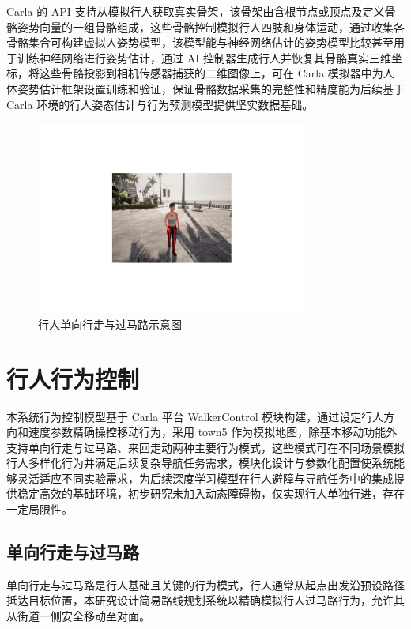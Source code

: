 Carla 的 API 支持从模拟行人获取真实骨架，该骨架由含根节点或顶点及定义骨骼姿势向量的一组骨骼组成，这些骨骼控制模拟行人四肢和身体运动，通过收集各骨骼集合可构建虚拟人姿势模型，该模型能与神经网络估计的姿势模型比较甚至用于训练神经网络进行姿势估计，通过 AI 控制器生成行人并恢复其骨骼真实三维坐标，将这些骨骼投影到相机传感器捕获的二维图像上，可在 Carla 模拟器中为人体姿势估计框架设置训练和验证，保证骨骼数据采集的完整性和精度能为后续基于 Carla 环境的行人姿态估计与行为预测模型提供坚实数据基础。

\begin{figure}[H]
    \centering
    \includegraphics[width=0.8\textwidth]{images/pedestrian_skeleton.pdf}
    \caption{行人单向行走与过马路示意图}
    \label{f.pedestrian_skeleton}
\end{figure}

\section{行人行为控制}
本系统行为控制模型基于 Carla 平台 WalkerControl 模块构建，通过设定行人方向和速度参数精确操控移动行为，采用 town5 作为模拟地图，除基本移动功能外支持单向行走与过马路、来回走动两种主要行为模式，这些模式可在不同场景模拟行人多样化行为并满足后续复杂导航任务需求，模块化设计与参数化配置使系统能够灵活适应不同实验需求，为后续深度学习模型在行人避障与导航任务中的集成提供稳定高效的基础环境，初步研究未加入动态障碍物，仅实现行人单独行进，存在一定局限性。

\subsection{单向行走与过马路}
单向行走与过马路是行人基础且关键的行为模式，行人通常从起点出发沿预设路径抵达目标位置，本研究设计简易路线规划系统以精确模拟行人过马路行为，允许其从街道一侧安全移动至对面。

